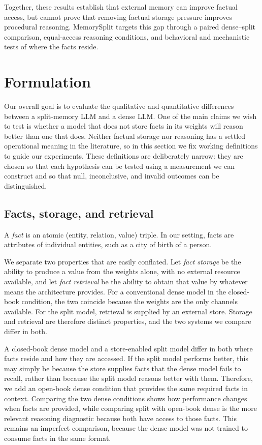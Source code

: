 \documentclass{article}
\begin{document}
Together, these results establish that external memory can improve factual access, but cannot prove that removing factual storage pressure improves procedural reasoning. MemorySplit targets this gap through a paired dense–split comparison, equal-access reasoning conditions, and behavioral and mechanistic tests of where the facts reside.

\section{Formulation}

Our overall goal is to evaluate the qualitative and quantitative differences between a split-memory LLM and a dense LLM. One of the main claims we wish to test is whether a model that does not store facts in its weights will reason better than one that does. Neither factual storage nor reasoning has a settled operational meaning in the literature, so in this section we fix working definitions to guide our experiments. These definitions are deliberately narrow: they are chosen so that each hypothesis can be tested using a measurement we can construct and so that null, inconclusive, and invalid outcomes can be distinguished.

\subsection{Facts, storage, and retrieval}

A \emph{fact} is an atomic (entity, relation, value) triple. In our setting, facts are attributes of individual entities, such as a city of birth of a person.

We separate two properties that are easily conflated. Let \emph{fact storage} be the ability to produce a value from the weights alone, with no external resource available, and let \emph{fact retrieval} be the ability to obtain that value by whatever means the architecture provides. For a conventional dense model in the closed-book condition, the two coincide because the weights are the only channels available. For the split model, retrieval is supplied by an external store. Storage and retrieval are therefore distinct properties, and the two systems we compare differ in both.

A closed-book dense model and a store-enabled split model differ in both where facts reside and how they are accessed. If the split model performs better, this may simply be because the store supplies facts that the dense model fails to recall, rather than because the split model reasons better with them. Therefore, we add an open-book dense condition that provides the same required facts in context. Comparing the two dense conditions shows how performance changes when facts are provided, while comparing split with open-book dense is the more relevant reasoning diagnostic because both have access to those facts. This remains an imperfect comparison, because the dense model was not trained to consume facts in the same format.
\end{document}
